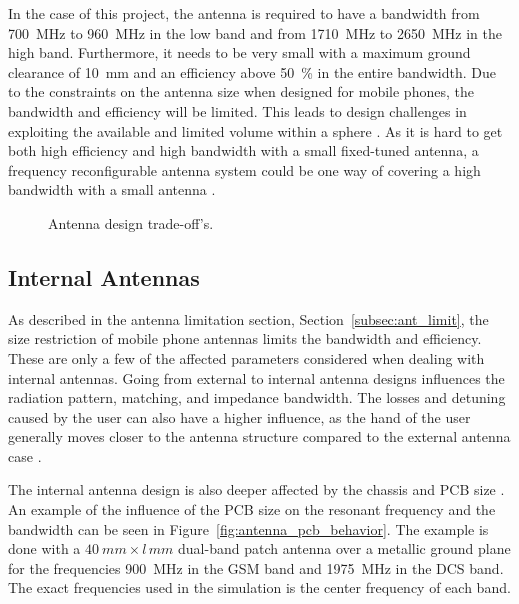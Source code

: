 In the case of this project, the antenna is required to have a bandwidth from \SI{700}{MHz} to \SI{960}{MHz} in the low band and from \SI{1710}{MHz} to \SI{2650}{MHz} in the high band. Furthermore, it needs to be very small with a maximum ground clearance of \SI{10}{mm} and an efficiency above \SI{50}{\percent} in the entire bandwidth. Due to the constraints on the antenna size when designed for mobile phones, the bandwidth and efficiency will be limited. This leads to design challenges in exploiting the available and limited volume within a sphere \cite{balanis2012antenna}.
As it is hard to get both high efficiency and high bandwidth with a small fixed-tuned antenna, a frequency reconfigurable antenna system could be one way of covering a high bandwidth with a small antenna \cite{hilbert2015tradeoff}.  

\begin{figure}[htbp]
    \centering
    \caption{Antenna design trade-off's.}
    \label{fig:antenna_tradeoff}
\end{figure}

\FloatBarrier
\subsection{Internal Antennas}
As described in the antenna limitation section, Section~\ref{subsec:ant_limit}, the size restriction of mobile phone antennas limits the bandwidth and efficiency.
These are only a few of the affected parameters considered when dealing with internal antennas. Going from external to internal antenna designs influences the radiation pattern, matching, and impedance bandwidth. The losses and detuning caused by the user can also have a higher influence, as the hand of the user generally moves closer to the antenna structure compared to the external antenna case \cite{fujimoto2008mobile}. 

The internal antenna design is also deeper affected by the chassis and PCB size \cite{sanchez2008multiband}. An example of the influence of the PCB size on the resonant frequency and the bandwidth can be seen in Figure~\ref{fig:antenna_pcb_behavior}. The example is done with a $\SI{40}{mm} \times l\,\si{mm}$ dual-band patch antenna over a metallic ground plane for the frequencies \SI{900}{MHz} in the GSM band and \SI{1975}{MHz} in the DCS band. The exact frequencies used in the simulation is the center frequency of each band. 

